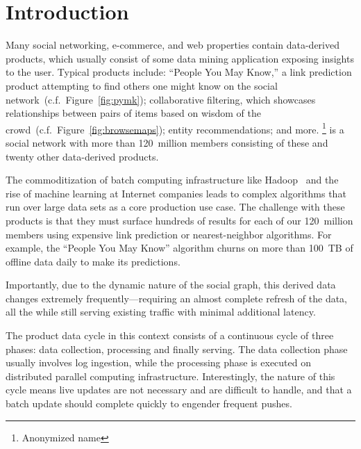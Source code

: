\section{Introduction}
\label{sec:introduction}

Many social networking, e-commerce, and web properties contain
data-derived products, which usually consist of some data mining
application exposing insights to the user. Typical products include:
``People You May Know,'' a link prediction product attempting to find
others one might know on the social
network~(c.f.~Figure~\ref{fig:pymk}); collaborative filtering, which
showcases relationships between pairs of items based on wisdom of
the crowd~(c.f.~Figure~\ref{fig:browsemaps}); entity
recommendations; and more. \linkedin\footnote{Anonymized name} is a
social network with more than 120~million members consisting of
these and twenty other data-derived products. 

The commoditization of batch computing infrastructure like Hadoop~\cite{hadoop}
 and the rise of machine learning at Internet companies leads to complex
algorithms that run over large data sets as a core production use
case. The challenge with these products is that they must surface
hundreds of results for each of our 120~million members using
expensive link prediction or nearest-neighbor algorithms. For example,
the ``People You May Know'' algorithm churns on more than 100~TB of offline data
daily to make its predictions.

Importantly, due to the dynamic nature of the social graph, this
derived data changes extremely frequently---requiring an almost
complete refresh of the data, all the while still serving existing
traffic with minimal additional latency. 

The product data cycle in this context consists of a continuous cycle
of three phases: data collection, processing and finally serving. The
data collection phase usually involves log ingestion, while the
processing phase is executed on distributed parallel computing
infrastructure.  Interestingly, the nature of this cycle means live
updates are not necessary and are difficult to handle, and that a
batch update should complete quickly to engender frequent pushes.
 
